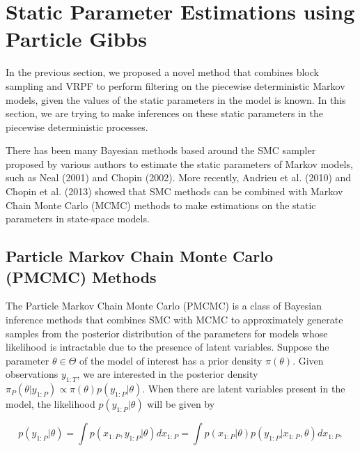 \documentclass[12pt,a4paper]{article}
\begin{document}
\section{Static Parameter Estimations using Particle Gibbs}
In the previous section, we proposed a novel method that combines block sampling and VRPF to perform filtering on the piecewise deterministic Markov models, given the values of the static parameters in the model is known. In this section, we are trying to make inferences on these static parameters in the piecewise deterministic processes. 

There has been many Bayesian methods based around the SMC sampler proposed by various authors to estimate the static parameters of Markov models, such as Neal (2001) and Chopin (2002). More recently, Andrieu et al. (2010) and Chopin et al. (2013) showed that SMC methods can be combined with Markov Chain Monte Carlo (MCMC) methods to make estimations on the static parameters in state-space models. 
\subsection{Particle Markov Chain Monte Carlo (PMCMC) Methods}\label{section:particle filtering simulations}
The Particle Markov Chain Monte Carlo (PMCMC) is a class of Bayesian inference methods that combines SMC with MCMC to approximately generate samples from the posterior distribution of the parameters for models whose likelihood is intractable due to the presence of latent variables. Suppose the parameter $\theta \in \Theta$ of the model of interest has a prior density $\pi(\theta)$. Given observations $y_{1:T}$, we are interested in the posterior density $\pi_P(\theta|y_{1:P}) \propto \pi(\theta)p(y_{1:P}|\theta)$. When there are latent variables present in the model, the likelihood $p(y_{1:P}|\theta)$ will be given by

\begin{equation}
    \label{PMCMC-marginal likelihood}
    p(y_{1:P}|\theta) = \int p(x_{1:P},y_{1:P}|\theta)dx_{1:P} = \int p(x_{1:P}|\theta) p(y_{1:P}|x_{1:P},\theta) dx_{1:P},
\end{equation}
\end{document}
